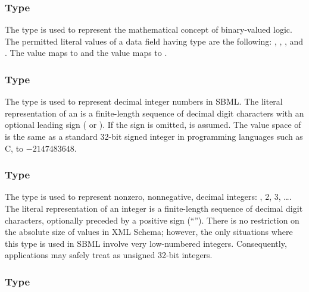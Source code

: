 \subsubsection{Type }
\label{sec:boolean}

The \xmlschemaone type  is used to represent the
mathematical concept of binary-valued logic.  The permitted
literal values of a data field having type  are
the following: , , , and .  The
value  maps to  and the value  maps to
.


\subsubsection{Type }
\label{sec:integer}

The \xmlschemaone type  is used to represent decimal
integer numbers in SBML.  The literal representation of an
 is a finite-length sequence of decimal digit
characters with an optional leading sign (\val{+} or \val{-}).  If
the sign is omitted, \val{+} is assumed.  The value space of
 is the same as a standard 32-bit signed integer in
programming languages such as C,  to $-2147483648$.


\subsubsection{Type }
\label{sec:positiveinteger}

The \xmlschemaone type  is used to
represent nonzero, nonnegative, decimal integers: , 2, 3,
\ldots.  The literal representation of an integer is a
finite-length sequence of decimal digit characters, optionally
preceded by a positive sign (``\token{+}'').  There is no
restriction on the absolute size of 
values in XML Schema; however, the only situations where this type
is used in SBML involve very low-numbered integers.  Consequently,
applications may safely treat  as
unsigned 32-bit integers.


\subsubsection{Type }
\label{sec:double}

